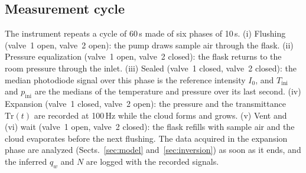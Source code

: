 \documentclass[preprint,review,12pt,authoryear]{elsarticle}
\begin{document}
\subsection{Measurement cycle}
\label{sec:cycle}
The instrument repeats a cycle of 60\,s made of six phases of 10\,s.
(i) Flushing (valve~1 open, valve~2 open): the pump draws sample air through the flask.
(ii) Pressure equalization (valve~1 open, valve~2 closed): the flask returns to the room pressure
through the inlet.
(iii) Sealed (valve~1 closed, valve~2 closed): the median photodiode signal over this phase is the
reference intensity $I_0$, and $T_\mathrm{ini}$ and $p_\mathrm{ini}$ are the medians of the
temperature and pressure over its last second.
(iv) Expansion (valve~1 closed, valve~2 open): the pressure and the transmittance $\mathrm{Tr}(t)$
are recorded at 100\,Hz while the cloud forms and grows.
(v) Vent and (vi) wait (valve~1 open, valve~2 closed): the flask refills with sample air and the
cloud evaporates before the next flushing.
The data acquired in the expansion phase are analyzed (Sects.~\ref{sec:model}
and~\ref{sec:inversion}) as soon as it ends, and the inferred $q_w$ and $N$ are logged with the
recorded signals. 
\end{document}
